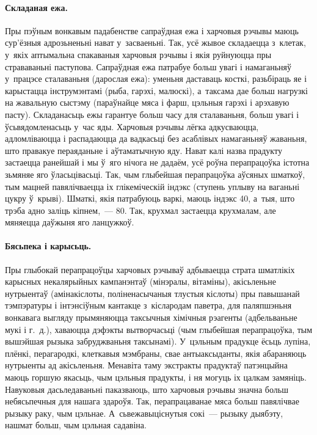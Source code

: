 \paragraph{Складаная ежа.}
Пры пэўным вонкавым падабенстве сапраўдная ежа і харчовыя рэчывы маюць сур'ёзныя адрозьненьні нават у~засваеньні. Так, усё жывое складаецца з~клетак, у~якіх аптымальна спакаваныя харчовыя рэчывы і якія руйнуюцца пры страваваньні паступова. Сапраўдная ежа патрабуе больш увагі і намаганьняў у~працэсе сталаваньня (дарослая ежа): уменьня даставаць косткі, разьбіраць яе і карыстацца інструмэнтамі (рыба, гарэхі, малюскі), а~таксама дае больш нагрузкі на жавальную сыстэму (параўнайце мяса і фарш, цэльныя гарэхі і арэхавую пасту). Складанасьць ежы гарантуе больш часу для сталаваньня, больш увагі і ўсьвядомленасьць у~час яды. Харчовыя рэчывы лёгка адкусваюцца, адломліваюцца і распадаюцца да вадкасьці без асаблівых намаганьняў жаваньня, што правакуе пераяданьне і аўтаматычную яду. Нават калі назва прадукту застаецца ранейшай і мы ў~яго нічога не дадаём, усё роўна перапрацоўка істотна зьмяняе яго ўласьцівасьці. Так, чым глыбейшая перапрацоўка аўсяных шматкоў, тым мацней павялічваецца іх глікеміческій індэкс (ступень уплыву на ваганьні цукру ў~крыві). Шматкі, якія патрабуюць варкі, маюць індэкс 40, а~тыя, што трэба адно заліць кіпнем,~--- 80. Так, крухмал застаецца крухмалам, але мяняецца даўжыня яго ланцужкоў.

\paragraph{Бясьпека і карысьць.}
Пры глыбокай перапрацоўцы харчовых рэчываў адбываецца страта шматлікіх карысных некалярыйных кампанэнтаў (мінэралы, вітаміны), акісьленьне нутрыентаў (амінакіслоты, поліненасычаныя тлустыя кіслоты) пры павышанай тэмпэратуры і інтэнсіўным кантакце з~кіслародам паветра, для паляпшэньня вонкавага выгляду прымяняюцца таксычныя хімічныя рэагенты (адбельваньне мукі і г.~д.), хаваюцца дэфэкты вытворчасьці (чым глыбейшая перапрацоўка, тым вышэйшая рызыка забруджваньня таксынамі). У~цэльным прадукце ёсьць лупіна, плёнкі, перагародкі, клеткавыя мэмбраны, свае антыаксыданты, якія абараняюць нутрыенты ад акісьленьня. Менавіта таму экстракты прадуктаў патэнцыйна маюць горшую якасьць, чым цэльныя прадукты, і ня могуць іх цалкам замяніць. Навуковыя дасьледаваньні паказваюць, што харчовыя рэчывы значна больш небясьпечныя для нашага здароўя. Так, перапрацаванае мяса больш павялічвае рызыку раку, чым цэльнае. А~сьвежавыціснутыя сокі~--- рызыку дыябэту, нашмат больш, чым цэльная садавіна.

